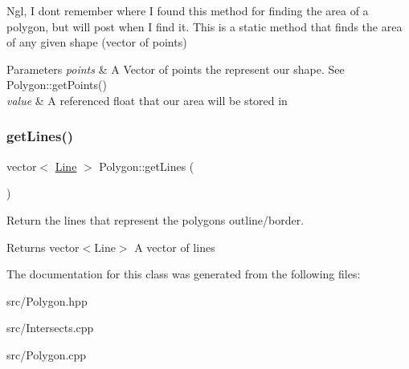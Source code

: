 Ngl, I don\textquotesingle{}t remember where I found this method for finding the area of a polygon, but will post when I find it. This is a static method that finds the area of any given shape (vector of points) 


\begin{DoxyParams}{Parameters}
{\em points} & A Vector of points the represent our shape. See Polygon\+::get\+Points() \\
\hline
{\em value} & A referenced float that our area will be stored in \\
\hline
\end{DoxyParams}
\mbox{\label{class_polygon_acbeaa5a9990ee704fdfa766d4a34b86c}} 
\subsubsection{\texorpdfstring{getLines()}{getLines()}}
{\footnotesize\ttfamily vector$<$ \mbox{\hyperlink{class_line}{Line}} $>$ Polygon\+::get\+Lines (\begin{DoxyParamCaption}{ }\end{DoxyParamCaption})}



Return the lines that represent the polygon\textquotesingle{}s outline/border. 

\begin{DoxyReturn}{Returns}
vector$<$\+Line$>$ A vector of lines 
\end{DoxyReturn}


The documentation for this class was generated from the following files\+:\begin{DoxyCompactItemize}
\item 
src/Polygon.\+hpp\item 
src/Intersects.\+cpp\item 
src/Polygon.\+cpp\end{DoxyCompactItemize}
